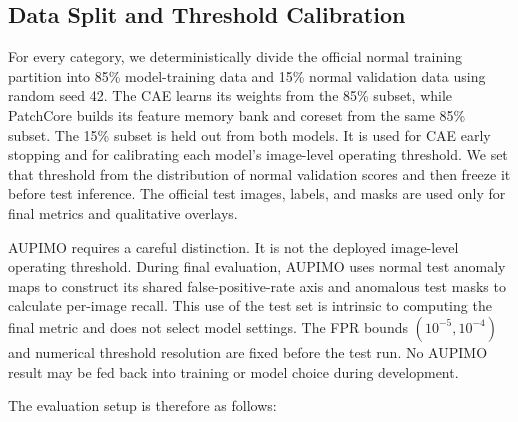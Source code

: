 \documentclass[11pt, a4paper]{article}
\begin{document}
\subsection{Data Split and Threshold Calibration}
\label{sec:leakage}

For every category, we deterministically divide the official normal training partition into 85\% model-training data and 15\% normal validation data using random seed 42. The CAE learns its weights from the 85\% subset, while PatchCore builds its feature memory bank and coreset from the same 85\% subset. The 15\% subset is held out from both models. It is used for CAE early stopping and for calibrating each model's image-level operating threshold. We set that threshold from the distribution of normal validation scores and then freeze it before test inference. The official test images, labels, and masks are used only for final metrics and qualitative overlays.

AUPIMO requires a careful distinction. It is not the deployed image-level operating threshold. During final evaluation, AUPIMO uses normal test anomaly maps to construct its shared false-positive-rate axis and anomalous test masks to calculate per-image recall. This use of the test set is intrinsic to computing the final metric and does not select model settings. The FPR bounds $(10^{-5},10^{-4})$ and numerical threshold resolution are fixed before the test run. No AUPIMO result may be fed back into training or model choice during development.

The evaluation setup is therefore as follows:
\end{document}
